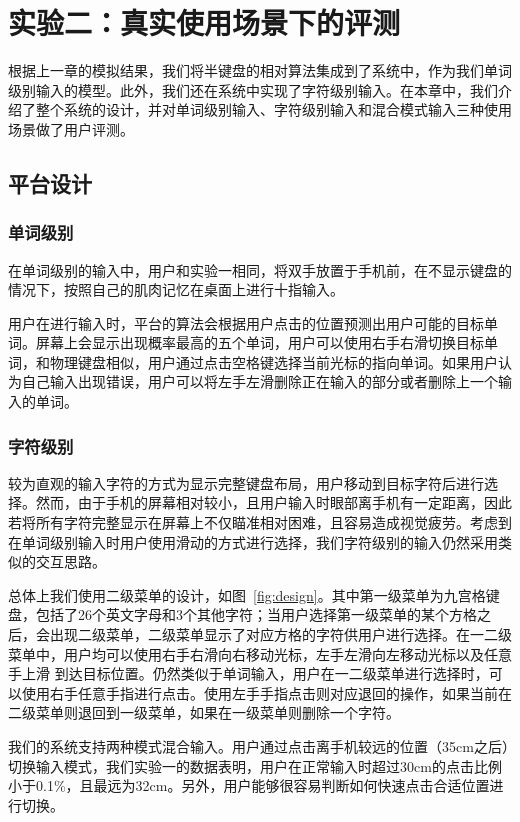 \chapter{实验二：真实使用场景下的评测} %
\label{cha:evaluation}
根据上一章的模拟结果，我们将半键盘的相对算法集成到了系统中，作为我们单词级别输入的模型。此外，我们还在系统中实现了字符级别输入。在本章中，我们介绍了整个系统的设计，并对单词级别输入、字符级别输入和混合模式输入三种使用场景做了用户评测。

\section{平台设计}
\subsection{单词级别}
在单词级别的输入中，用户和实验一相同，将双手放置于手机前，在不显示键盘的情况下，按照自己的肌肉记忆在桌面上进行十指输入。

用户在进行输入时，平台的算法会根据用户点击的位置预测出用户可能的目标单词。屏幕上会显示出现概率最高的五个单词，用户可以使用右手右滑切换目标单词，和物理键盘相似，用户通过点击空格键选择当前光标的指向单词。如果用户认为自己输入出现错误，用户可以将左手左滑删除正在输入的部分或者删除上一个输入的单词。

\subsection{字符级别}
较为直观的输入字符的方式为显示完整键盘布局，用户移动到目标字符后进行选择。然而，由于手机的屏幕相对较小，且用户输入时眼部离手机有一定距离，因此若将所有字符完整显示在屏幕上不仅瞄准相对困难，且容易造成视觉疲劳。考虑到在单词级别输入时用户使用滑动的方式进行选择，我们字符级别的输入仍然采用类似的交互思路。

总体上我们使用二级菜单的设计，如图~\ref{fig:design}。其中第一级菜单为九宫格键盘，包括了26个英文字母和3个其他字符；当用户选择第一级菜单的某个方格之后，会出现二级菜单，二级菜单显示了对应方格的字符供用户进行选择。在一二级菜单中，用户均可以使用右手右滑向右移动光标，左手左滑向左移动光标以及任意手上滑 到达目标位置。仍然类似于单词输入，用户在一二级菜单进行选择时，可以使用右手任意手指进行点击。使用左手手指点击则对应退回的操作，如果当前在二级菜单则退回到一级菜单，如果在一级菜单则删除一个字符。

我们的系统支持两种模式混合输入。用户通过点击离手机较远的位置（35cm之后）切换输入模式，我们实验一的数据表明，用户在正常输入时超过30cm的点击比例小于0.1\%，且最远为32cm。另外，用户能够很容易判断如何快速点击合适位置进行切换。

